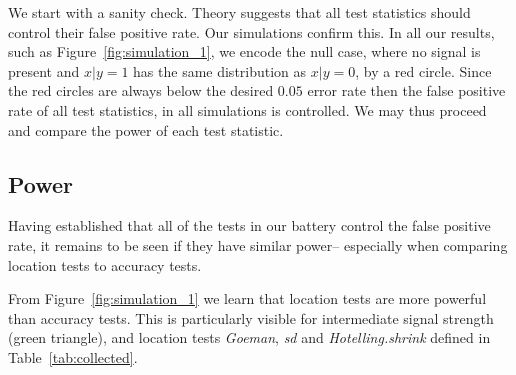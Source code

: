 \documentclass[12pt,a4paper]{article}
\begin{document}
We start with a sanity check. 
Theory suggests that all test statistics should control their false positive rate. 
Our simulations confirm this.
In all our results, such as Figure~\ref{fig:simulation_1}, we encode the null case, where no signal is present and $x|y=1$ has the same distribution as $x|y=0$, by a red circle. 
Since the red circles are always below the desired $0.05$ error rate then the false positive rate of all test statistics, in all simulations is controlled. 
We may thus proceed and compare the power of each test statistic. 






\subsection{Power}
\label{sec:power}

Having established that all of the tests in our battery control the false positive rate, it remains to be seen if they have similar power-- especially when comparing location tests to accuracy tests. 

From Figure~\ref{fig:simulation_1} we learn that location tests are more powerful than accuracy tests.
This is particularly visible for intermediate signal strength (green triangle), and location tests \emph{Goeman}, \emph{sd} and \emph{Hotelling.shrink} defined in Table~\ref{tab:collected}.
\end{document}
